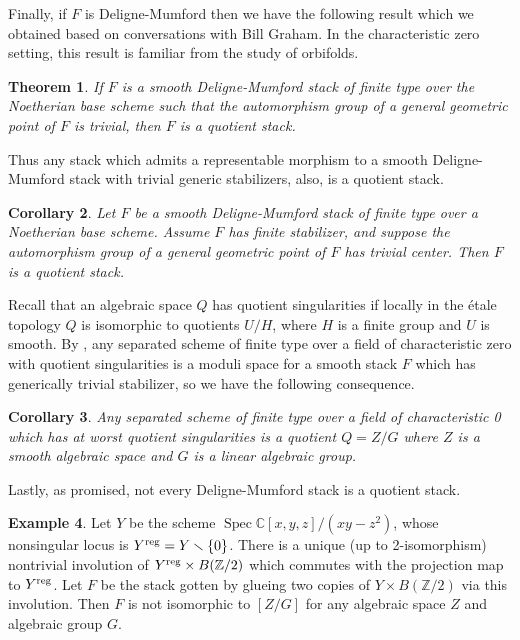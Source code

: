 \documentclass[12pt]{amsart}
\newcommand{\Z}{{\mathbb Z}}
\newcommand{\C}{{\mathbb C}}
\DeclareMathOperator{\spec}{Spec}
\theoremstyle{plain}
\newtheorem  {thm}        {Theorem}     [section]
\newtheorem  {cor}  [thm] {Corollary}
\theoremstyle{definition}
\newtheorem  {exml} [thm] {Example}
\theoremstyle{remark}
\begin{document}
Finally, if $F$ is Deligne-Mumford then we have the following result
which we obtained based on conversations with Bill Graham.
In the characteristic zero setting, this result is familiar from the
study of orbifolds.
\begin{thm} \label{thm.dm}
If $F$ is a smooth Deligne-Mumford stack
of finite type over the Noetherian base scheme
such that the automorphism group of 
a general geometric point of $F$ is trivial, then
$F$ is a quotient stack.
\end{thm}
Thus any stack which admits a representable morphism to a
smooth Deligne-Mumford stack with trivial generic stabilizers, also, is a
quotient stack.

\begin{cor} \label{c.trivcenter}
Let $F$ be a smooth Deligne-Mumford stack of finite type
over a Noetherian base scheme.
Assume $F$ has finite stabilizer,
and suppose the automorphism group of a general geometric point of $F$
has trivial center.
Then $F$ is a quotient stack.
\end{cor}

Recall that an algebraic space $Q$ has
quotient singularities if locally in the \'etale topology
$Q$ is isomorphic to quotients $U/H$, where $H$ is a finite group
and $U$ is smooth.
By \cite[Proposition 2.8]{Vi},
any separated scheme of finite type over a field of characteristic zero
with quotient singularities is a moduli space
for a smooth stack $F$ which has generically trivial stabilizer,
so we have the following consequence.
\begin{cor} \label{c.quot}
Any separated scheme of finite type over a field of
characteristic 0 which has at worst  quotient
singularities is a quotient $Q = Z/G$ where
$Z$ is a smooth algebraic space and $G$ is a linear algebraic group.
\end{cor}

Lastly, as promised, not every Deligne-Mumford stack is a
quotient stack.

\begin{exml} \label{e.noquotient}
Let $Y$ be the scheme $\spec \C[x,y,z]/(xy-z^2)$, whose nonsingular
locus is $Y^{\rm reg}=Y\smallsetminus\{0\}$.
There is a unique (up to 2-isomorphism) nontrivial involution of
$Y^{\rm reg}\times B(\Z/2)$ which commutes with the projection
map to $Y^{\rm reg}$.
Let $F$ be the stack gotten by glueing two copies of
$Y\times B(\Z/2)$ via this involution.
Then $F$ is not isomorphic to $[Z/G]$ for any algebraic space $Z$ and
algebraic group $G$.
\end{exml}
\end{document}
